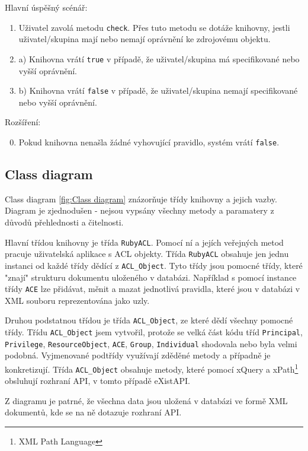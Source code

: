 Hlavní úspěšný scénář:
\begin{enumerate}
\item Uživatel zavolá metodu \verb|check|. Přes tuto metodu se dotáže knihovny, jestli uživatel/skupina mají nebo nemají oprávnění ke zdrojovému objektu.
\item a) Knihovna vrátí \verb|true| v případě, že uživatel/skupina má specifikované nebo vyšší oprávnění.
\setcounter{enumi}{1}
\item b) Knihovna vrátí \verb|false| v případě, že uživatel/skupina nemají specifikované nebo vyšší oprávnění.
\end{enumerate}
Rozšíření:
\begin{enumerate}
\setcounter{enumi}{-1}
\item Pokud knihovna nenašla žádné vyhovující pravidlo, systém vrátí \verb|false|.
\end{enumerate}


\subsection{Class diagram}
Class diagram \ref{fig:Class diagram} znázorňuje třídy knihovny a jejich vazby. Diagram je zjednodušen - nejsou vypsány všechny metody a paramatery z důvodů přehlednosti a čitelnosti. 

Hlavní třídou knihovny je třída \verb|RubyACL|. Pomocí ní a jejích veřejných metod pracuje uživatelská aplikace s ACL objekty. Třída \verb|RubyACL| obsahuje jen jednu instanci od každé třídy dědící z \verb|ACL_Object|. Tyto třídy jsou pomocné třídy, které "znají" strukturu dokumentu uloženého v databázi. Například s pomocí instance třídy \verb|ACE| lze přidávat, měnit a mazat jednotlivá pravidla, které jsou v databázi v XML souboru reprezentována jako uzly.

Druhou podstatnou třídou je třída \verb|ACL_Object|, ze které dědí všechny pomocné třídy. Třídu \verb|ACL_Object| jsem vytvořil, protože se velká část kódu tříd \verb|Principal|, \verb|Privilege|, \verb|ResourceObject|, \verb|ACE|, \verb|Group|, \verb|Individual| shodovala nebo byla velmi podobná. Vyjmenované podtřídy využívají zděděné metody a případně je konkretizují.
Třída  \verb|ACL_Object| obsahuje metody, které pomocí xQuery a xPath\footnote{XML Path Language} obsluhují rozhraní API, v tomto případě eXistAPI.

Z diagramu je patrné, že všechna data jsou uložená v databázi ve formě XML dokumentů, kde se na ně dotazuje rozhraní API.

